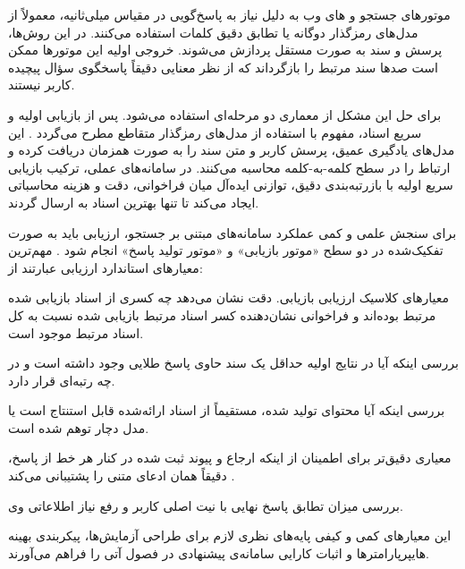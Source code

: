 
موتورهای جستجو و های وب به دلیل نیاز به پاسخ‌گویی در مقیاس میلی‌ثانیه، معمولاً از مدل‌های رمزگذار دوگانه \cite{reimers2019sentence} یا تطابق دقیق کلمات استفاده می‌کنند. در این روش‌ها، پرسش و سند به صورت مستقل پردازش می‌شوند. خروجی اولیه این موتورها ممکن است صدها سند مرتبط را بازگرداند که از نظر معنایی دقیقاً پاسخگوی سؤال پیچیده کاربر نیستند.

برای حل این مشکل از معماری دو مرحله‌ای استفاده می‌شود. پس از بازیابی اولیه و سریع اسناد، مفهوم  با استفاده از مدل‌های رمزگذار متقاطع مطرح می‌گردد \cite{nogueira2019passage}. این مدل‌های یادگیری عمیق، پرسش کاربر و متن سند را به صورت همزمان دریافت کرده و ارتباط را در سطح کلمه-به-کلمه محاسبه می‌کنند. در سامانه‌های عملی، ترکیب بازیابی سریع اولیه با بازرتبه‌بندی دقیق، توازنی ایده‌آل میان فراخوانی، دقت و هزینه محاسباتی ایجاد می‌کند \cite{thakur2021beir} تا تنها بهترین اسناد به  ارسال گردند.


برای سنجش علمی و کمی عملکرد سامانه‌های  مبتنی بر جستجو، ارزیابی باید به صورت تفکیک‌شده در دو سطح «موتور بازیابی» و «موتور تولید پاسخ» انجام شود \cite{es2023ragas}. مهم‌ترین معیارهای استاندارد ارزیابی عبارتند از:


  معیارهای کلاسیک ارزیابی بازیابی. دقت نشان می‌دهد چه کسری از اسناد بازیابی شده مرتبط بوده‌اند و فراخوانی نشان‌دهنده کسر اسناد مرتبط بازیابی شده نسبت به کل اسناد مرتبط موجود است.

  بررسی اینکه آیا در نتایج اولیه حداقل یک سند حاوی پاسخ طلایی وجود داشته است و در چه رتبه‌ای قرار دارد.

  بررسی اینکه آیا محتوای تولید شده، مستقیماً از اسناد ارائه‌شده قابل استنتاج است یا مدل دچار توهم شده است.

  معیاری دقیق‌تر برای اطمینان از اینکه ارجاع و پیوند ثبت شده در کنار هر خط از پاسخ، دقیقاً همان ادعای متنی را پشتیبانی می‌کند \cite{gao2023citations}.

  بررسی میزان تطابق پاسخ نهایی با نیت اصلی کاربر و رفع نیاز اطلاعاتی وی.


این معیارهای کمی و کیفی پایه‌های نظری لازم برای طراحی آزمایش‌ها، پیکربندی بهینه هایپرپارامترها و اثبات کارایی سامانه‌ی پیشنهادی در فصول آتی را فراهم می‌آورند.